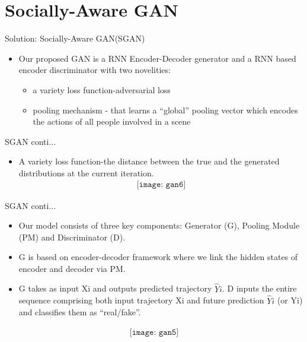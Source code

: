 \documentclass{beamer}
\begin{document}
\section{Socially-Aware GAN}
\begin{frame}{Solution: Socially-Aware GAN(SGAN)} 
\begin{itemize}
\item \Large Our proposed GAN is a RNN Encoder-Decoder generator and a RNN based encoder discriminator with two novelities:
\begin{itemize}
    \item {\large a variety loss function-adversarial loss}
    \item {\large pooling mechanism - that learns a “global” pooling vector which encodes the actions of all people
involved in a scene}
\end{itemize}
\end{itemize}
\end{frame}
\begin{frame}{SGAN conti...} 
\begin{itemize}
     \item {\large A} {\LARGE variety loss function}{\large -the distance between the true and the generated distributions at the current iteration.}
\begin{align*}
    \texttt{[image: gan6]}  
\end{align*}
\end{itemize}
\end{frame}
\begin{frame}{SGAN conti...} 
\begin{itemize}
    \item Our model consists of three key components: Generator (G),
Pooling Module (PM) and Discriminator (D).
\item G is based on encoder-decoder framework where we link the hidden
states of encoder and decoder via PM. 
\item G takes as input Xi and outputs predicted trajectory $\hat Yi$. D inputs the entire sequence comprising both input trajectory Xi and future prediction $\hat Yi$ (or Yi) and classifies them as “real/fake”.
\end{itemize}
\begin{align*}
    \texttt{[image: gan5]}  
\end{align*}
\end{frame}
\end{document}
